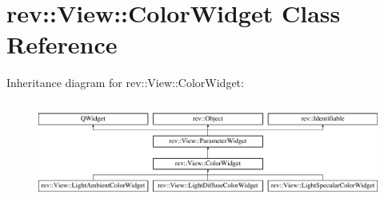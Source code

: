 \hypertarget{classrev_1_1_view_1_1_color_widget}{}\section{rev\+::View\+::Color\+Widget Class Reference}
\label{classrev_1_1_view_1_1_color_widget}
Inheritance diagram for rev\+::View\+::Color\+Widget\+:\begin{figure}[H]
\begin{center}
\leavevmode
\includegraphics[height=3.303835cm]{classrev_1_1_view_1_1_color_widget}
\end{center}
\end{figure}
